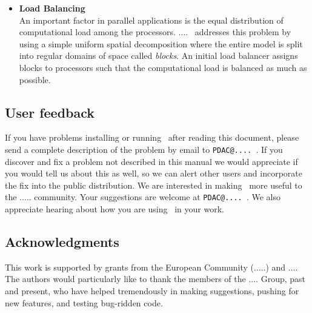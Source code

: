 \begin{itemize}
\item{\bf Load Balancing}\\
An important factor in parallel applications is the equal distribution
of computational load among the processors. 
....
\PDAC\ addresses this problem by using a simple uniform 
spatial decomposition where the entire model is split into regular domains of 
space called {\em blocks}. An initial load balancer assigns blocks
to processors such that the computational load is balanced as much as possible.

\end{itemize}

\subsection{User feedback}

If you have problems installing or running \PDAC\ after
reading this document, please send a
complete description of the problem by email to {\tt PDAC@.... }.  If
you discover and fix a problem not described in this manual we would
appreciate if you would tell us about this as well, so we can alert
other users and incorporate the fix into the public distribution.
\prettypar
We are interested in making \PDAC\ more useful to the .....
community.  Your suggestions are welcome at {\tt PDAC@.... }.
We also appreciate hearing about how you are using \PDAC\ in your work.

\subsection{Acknowledgments}

This work is supported by grants from the European Community
(.....) and ....
\prettypar
The authors would particularly like to thank the members of the
.... Group, past and present, who have helped
tremendously in making suggestions, pushing for new features, and
testing bug-ridden code.
